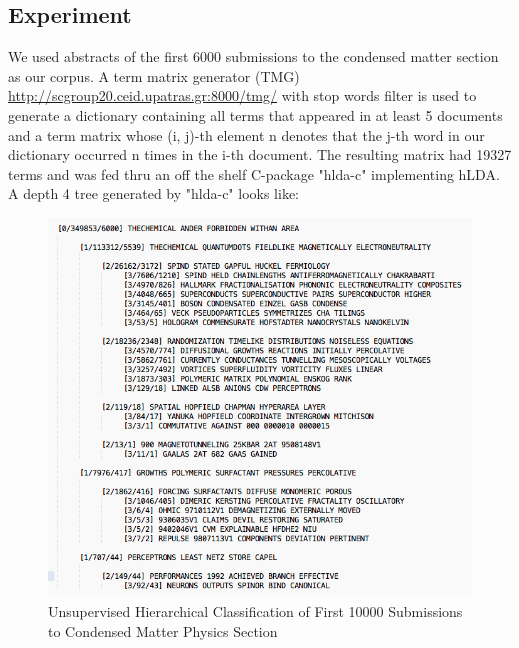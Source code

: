 \documentclass[DIV=calc, paper=a4, fontsize=11pt, twocolumn]{scrartcl}	 %
\begin{document}
\subsection*{Experiment}
We used abstracts of the first 6000 submissions to the condensed matter section as our corpus. A term matrix generator (TMG) \url{http://scgroup20.ceid.upatras.gr:8000/tmg/} with stop words filter is used to generate a dictionary containing all terms that appeared in at least 5 documents and a term matrix whose (i, j)-th element n denotes that the j-th word in our dictionary occurred n times in the i-th document. The resulting matrix had 19327 terms and was fed thru an off the shelf C-package "hlda-c" \cite{1} implementing hLDA.\\
A depth 4 tree generated by "hlda-c" looks like:\newline
			\begin{figure}[!ht]
				\centerline{\includegraphics[scale = 0.35]{tree10000.png}}
				\caption{Unsupervised Hierarchical Classification of First 10000 Submissions to Condensed Matter Physics Section}
			\end{figure}
\newline
\end{document}
